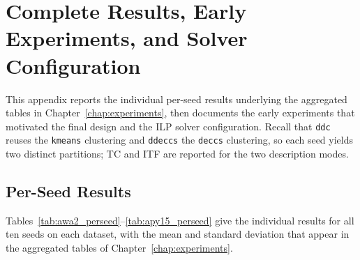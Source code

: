 \chapter{Complete Results, Early Experiments, and Solver Configuration}
\label{app:early_experiments}

This appendix reports the individual per-seed results underlying the aggregated tables in Chapter~\ref{chap:experiments}, then documents the early experiments that motivated the final design and the ILP solver configuration. Recall that \texttt{ddc} reuses the \texttt{kmeans} clustering and \texttt{ddeccs} the \texttt{deccs} clustering, so each seed yields two distinct partitions; TC and ITF are reported for the two description modes.

\section{Per-Seed Results}
\label{sec:perseed_results}

Tables~\ref{tab:awa2_perseed}--\ref{tab:apy15_perseed} give the individual results for all ten seeds on each dataset, with the mean and standard deviation that appear in the aggregated tables of Chapter~\ref{chap:experiments}.

